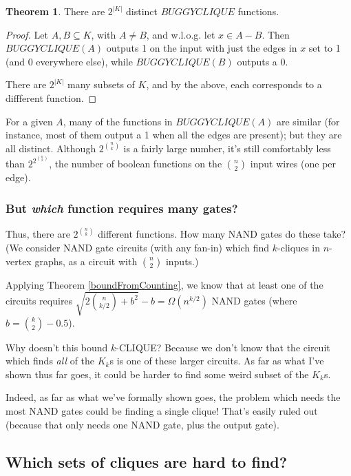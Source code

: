 \documentclass[12pt]{article}
\theoremstyle{definition}
\newtheorem{thm}{Theorem}[section]
\begin{document}
\begin{thm}
\label{buggyDistinct}
There are  $2^{|K|}$ distinct $BUGGYCLIQUE$ functions.
\end{thm}
\begin{proof}

Let $A,B \subseteq K$, with $A \neq B$, and w.l.o.g.
let $x \in A-B$. Then $BUGGYCLIQUE(A)$ outputs 1 on the input
with just the edges in $x$ set to 1 (and 0 everywhere else),
while $BUGGYCLIQUE(B)$ outputs a 0.

There are $2^{|K|}$ many subsets of $K$,
and by the above, each corresponds to a diffferent function.
\end{proof}

For a given $A$, many of the functions in $BUGGYCLIQUE(A)$
are similar (for instance, most
of them output a 1 when all the edges are present);
but they are all distinct.
Although $2^{n \choose k}$ is a fairly large number,
it's still comfortably less than $2^{2^{n \choose 2}}$, the number of boolean
functions on the ${n \choose 2}$ input wires (one per edge).

\subsubsection{But {\em which} function requires many gates?}

Thus, there are $2^{n \choose k}$ different functions. 
How many NAND gates do these take?
(We consider NAND gate circuits (with any fan-in) which find $k$-cliques in $n$-vertex
graphs, as a circuit with $n \choose 2$ inputs.)

Applying Theorem
\ref{boundFromCounting}, we know that at least one of the circuits requires
${\sqrt {2 {n \choose {k/2}} + b^2}} - b = \Omega(n^{k/2})$ 
NAND gates (where $b = {k \choose 2} - 0.5$).

Why doesn't this bound $k$-CLIQUE?
Because we don't know that the circuit which finds {\em all} of the
$K_k$s is one of these larger circuits. As far as what I've
shown thus far goes, it could be harder to find some weird subset of the $K_k$s.

Indeed, as far as what we've formally shown goes, the problem which needs
the most NAND gates could be finding a single clique! That's easily ruled out
(because that only needs one NAND gate, plus the output gate).

\subsection{Which sets of cliques are hard to find?}
\label{sec:whichCliques}
\end{document}
